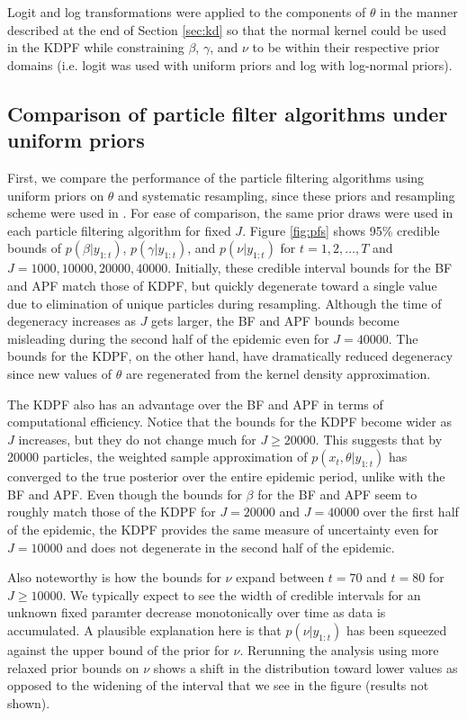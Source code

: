 \documentclass{elsarticle}
\begin{document}
Logit and log transformations were applied to the components of $\theta$ in the manner described at the end of Section \ref{sec:kd} so that the normal kernel could be used in the KDPF while constraining $\beta$, $\gamma$, and $\nu$ to be within their respective prior domains (i.e. logit was used with uniform priors and log with log-normal priors).

\subsection{Comparison of particle filter algorithms under uniform priors} \label{sec:pfcomparison}

First, we compare the performance of the particle filtering algorithms using uniform priors on $\theta$ and systematic resampling, since these priors and resampling scheme were used in \citet{skvortsov2012monitoring}. For ease of comparison, the same prior draws were used in each particle filtering algorithm for fixed $J$. Figure \ref{fig:pfs} shows 95\% credible bounds of $p(\beta|y_{1:t})$, $p(\gamma|y_{1:t})$, and $p(\nu|y_{1:t})$ for $t = 1,2,\ldots,T$ and $J = 1000, 10000, 20000, 40000$. Initially, these credible interval bounds for the BF and APF match those of KDPF, but quickly degenerate toward a single value due to elimination of unique particles during resampling. Although the time of degeneracy increases as $J$ gets larger, the BF and APF bounds become misleading during the second half of the epidemic even for $J = 40000$. The bounds for the KDPF, on the other hand, have dramatically reduced degeneracy since new values of $\theta$ are regenerated from the kernel density approximation.

The KDPF also has an advantage over the BF and APF in terms of computational efficiency. Notice that the bounds for the KDPF become wider as $J$ increases, but they do not change much for $J \ge 20000$. This suggests that by 20000 particles, the weighted sample approximation of $p(x_t,\theta|y_{1:t})$ has converged to the true posterior over the entire epidemic period, unlike with the BF and APF. Even though the bounds for $\beta$ for the BF and APF seem to roughly match those of the KDPF for $J = 20000$ and $J = 40000$ over the first half of the epidemic, the KDPF provides the same measure of uncertainty even for $J = 10000$ and does not degenerate in the second half of the epidemic.

Also noteworthy is how the bounds for $\nu$ expand between $t = 70$ and $t = 80$ for $J \ge 10000$. We typically expect to see the width of credible intervals for an unknown fixed paramter decrease monotonically over time as data is accumulated. A plausible explanation here is that $p(\nu|y_{1:t})$ has been squeezed against the upper bound of the prior for $\nu$. Rerunning the analysis using more relaxed prior bounds on $\nu$ shows a shift in the distribution toward lower values as opposed to the widening of the interval that we see in the figure (results not shown).
\end{document}
